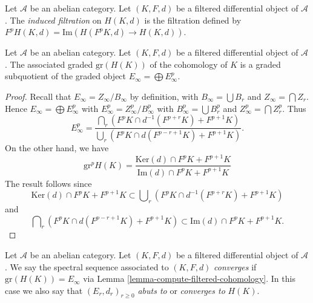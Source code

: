 \begin{definition}
\label{definition-filtration-cohomology-filtered-differential}
Let $\mathcal{A}$ be an abelian category.
Let $(K, F, d)$ be a filtered differential object of $\mathcal{A}$.
The {\it induced filtration} on $H(K, d)$ is the filtration defined
by $F^pH(K, d) = \text{Im}(H(F^pK, d) \to H(K, d))$.
\end{definition}

\begin{lemma}
\label{lemma-compute-filtered-cohomology}
Let $\mathcal{A}$ be an abelian category.
Let $(K, F, d)$ be a filtered differential object of $\mathcal{A}$.
The associated graded $\text{gr}(H(K))$ of the cohomology of
$K$ is a graded subquotient of the graded object
$E_\infty = \bigoplus E_\infty^p$.
\end{lemma}

\begin{proof}
Recall that $E_\infty = Z_\infty/B_\infty$ by definition, with
$B_\infty = \bigcup B_r$ and $Z_\infty = \bigcap Z_r$. Hence
$E_\infty = \bigoplus E_\infty^p$ with $E_\infty^p = Z_\infty^p/B_\infty^p$
with $B_\infty^p = \bigcup B_r^p$ and $Z_\infty^p = \bigcap Z_r^p$. Thus
$$
E_\infty^p =
\frac{\bigcap_r (F^pK \cap d^{-1}(F^{p + r}K) + F^{p + 1}K)}
{\bigcup_r (F^pK \cap d(F^{p - r + 1}K) + F^{p + 1}K)}.
$$
On the other hand, we have
$$
\text{gr}^p H(K) =
\frac{\text{Ker}(d) \cap F^pK + F^{p + 1}K}
{\text{Im}(d) \cap F^pK + F^{p + 1}K}
$$
The result follows since
\begin{equation}
\label{equation-on-top}
\text{Ker}(d) \cap F^pK + F^{p + 1}K
\subset
\bigcup\nolimits_r \left(F^pK \cap d^{-1}(F^{p + r}K) + F^{p + 1}K\right)
\end{equation}
and
\begin{equation}
\label{equation-at-bottom}
\bigcap\nolimits_r \left(F^pK \cap d(F^{p - r + 1}K) + F^{p + 1}K\right)
\subset
\text{Im}(d) \cap F^pK + F^{p + 1}K.
\end{equation}
\end{proof}

\begin{definition}
\label{definition-filtered-differential-ss-converges}
Let $\mathcal{A}$ be an abelian category.
Let $(K, F, d)$ be a filtered differential object of $\mathcal{A}$.
We say the spectral sequence associated to $(K, F, d)$
{\it converges} if $\text{gr}(H(K)) = E_{\infty}$ via
Lemma \ref{lemma-compute-filtered-cohomology}.
In this case we also say that $(E_r, d_r)_{r \geq 0}$ {\it abuts to}
or {\it converges to} $H(K)$.
\end{definition}

